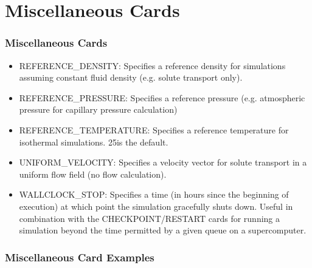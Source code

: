 \section{Miscellaneous Cards}

\begin{frame}\frametitle{Miscellaneous Cards}

\begin{itemize}
\item[] REFERENCE\_DENSITY: Specifies a reference density for simulations assuming constant fluid density (e.g. solute transport only).  
\item[] REFERENCE\_PRESSURE: Specifies a reference pressure (e.g. atmospheric pressure for capillary pressure calculation)
\item[] REFERENCE\_TEMPERATURE: Specifies a reference temperature for isothermal simulations.  25\degc is the default.
\item[] UNIFORM\_VELOCITY: Specifies a velocity vector for solute transport in a uniform flow field (no flow calculation).
\item[] WALLCLOCK\_STOP: Specifies a time (in hours since the beginning of execution) at which point the simulation gracefully shuts down.  Useful in combination with the CHECKPOINT/RESTART cards for running a simulation beyond the time permitted by a given queue on a supercomputer.

\end{itemize}

\end{frame}

\begin{frame}[fragile]\frametitle{Miscellaneous Card Examples}

\end{frame}
